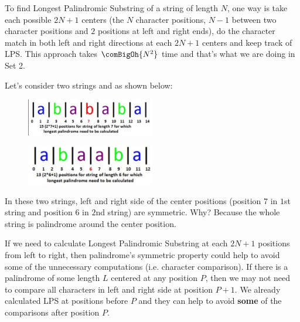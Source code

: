 To find Longest Palindromic Substring of a string of length $N$, one way is
take each possible $2N+1$ centers (the $N$ character positions, $N-1$
between two character positions and $2$ positions at left and right ends),
do the character match in both left and right directions at each $2N+1$
centers and keep track of LPS. This approach takes $\comBigOh{N^2}$ time and
that's what we are doing in Set 2.

Let's consider two strings  and  as shown below:

\begin{figure}
\centering
\includegraphics[width=0.5\textwidth]{Images/figGFGPalinManacher3}
\end{figure}

\begin{figure}
\centering
\includegraphics[width=0.5\textwidth]{Images/figGFGPalinManacher4}
\end{figure}


In these two strings, left and right side of the center positions (position
$7$ in $1$st string and position $6$ in $2$nd string) are symmetric. Why?
Because the whole string is palindrome around the center position.

If we need to calculate Longest Palindromic Substring at each $2N+1$
positions from left to right, then palindrome's symmetric property could
help to avoid some of the unnecessary computations (i.e. character
comparison). If there is a palindrome of some length $L$ centered at any
position $P$, then we may not need to compare all characters in left and
right side at position $P+1$. We already calculated LPS at positions before
$P$ and they can help to avoid \textbf{some} of the comparisons after
position $P$.

